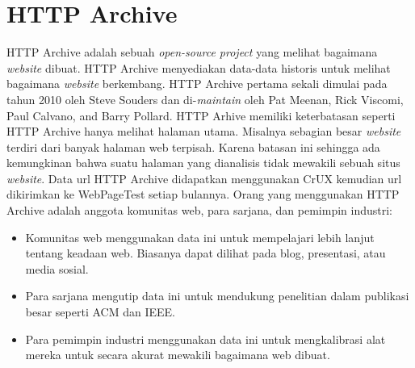 \section{HTTP Archive \cite{httparchiveAbout}}
HTTP Archive adalah sebuah \textit{open-source project} yang melihat bagaimana \textit{website} dibuat. HTTP Archive menyediakan data-data historis untuk melihat bagaimana \textit{website} berkembang. HTTP Archive pertama sekali dimulai pada tahun 2010 oleh Steve Souders dan di-\textit{maintain} oleh Pat Meenan, Rick Viscomi, Paul Calvano, and Barry Pollard. HTTP Arhive memiliki keterbatasan seperti HTTP Archive hanya melihat halaman utama. Misalnya sebagian besar \textit{website} terdiri dari banyak halaman web terpisah. Karena batasan ini sehingga ada kemungkinan bahwa suatu halaman yang dianalisis tidak mewakili sebuah situs \textit{website}. Data url HTTP Archive didapatkan menggunakan CrUX kemudian url dikirimkan ke WebPageTest setiap bulannya. Orang yang menggunakan HTTP Archive adalah anggota komunitas web, para sarjana, dan pemimpin industri:
\begin{itemize}
    \item Komunitas web menggunakan data ini untuk mempelajari lebih lanjut tentang keadaan web. Biasanya dapat dilihat pada blog, presentasi, atau media sosial. 
    \item Para sarjana mengutip data ini untuk mendukung penelitian dalam publikasi besar seperti ACM dan IEEE.
    \item Para pemimpin industri menggunakan data ini untuk mengkalibrasi alat mereka untuk secara akurat mewakili bagaimana web dibuat.
\end{itemize}



